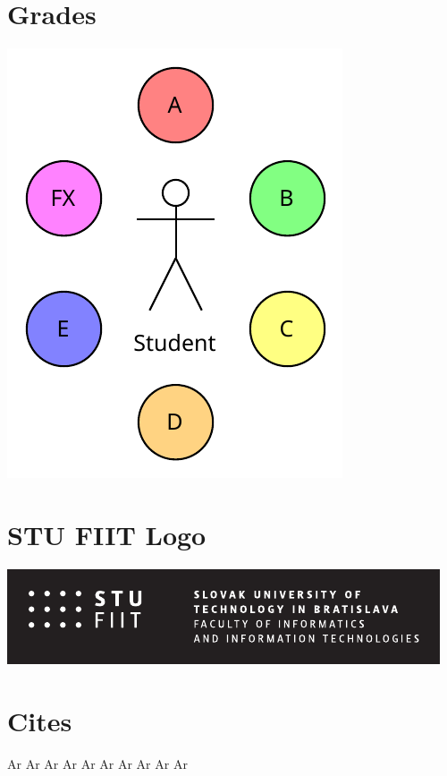 \documentclass[12pt,english,a4paper]{article}
\begin{document}
\section{Grades}
\begin{center}
    \includegraphics[scale=1,]{Grades.pdf}
\end{center}

\section{STU FIIT Logo}
\begin{center}
    \includegraphics[scale=1.5]{STU-FIIT-Logo.pdf}
\end{center}

\section{Cites}
Ar\cite{HLEDYJ-DeepLearning}
Ar\cite{CN-RecSystem}
Ar\cite{SNRJ-Movie}
Ar\cite{PKSAA-Summarization}
Ar\cite{NMY-Reinforcement}
Ar\cite{RSN-Network}
Ar\cite{YY-Multimodal}
Ar\cite{CMF-Hybrid}
Ar\cite{PHPAH-NLP}
Ar\cite{SSSDD-Integration}

\newpage

\printbibliography
\end{document}
